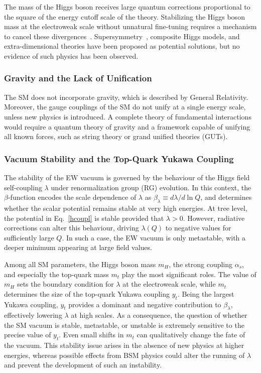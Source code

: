 The mass of the Higgs boson receives large quantum corrections proportional to the square of the energy cutoff scale of the theory. Stabilizing the Higgs boson mass at the electroweak scale without unnatural fine-tuning requires a mechanism to cancel these divergences~\cite{Weinberg:1975gm,Gildener:1976ai,Weinberg:1979bn,Susskind:1978ms}. Supersymmetry~\cite{Dimopoulos:1981zb,Witten:1981nf,Dine:1981za,Dimopoulos:1981au,Sakai:1981gr,Kaul:1981hi}, composite Higgs models, and extra-dimensional theories have been proposed as potential solutions, but no evidence of such physics has been observed.

\subsubsection*{Gravity and the Lack of Unification}

The SM does not incorporate gravity, which is described by General Relativity. Moreover, the gauge couplings of the SM do not unify at a single energy scale, unless new physics is introduced. A complete theory of fundamental interactions would require a quantum theory of gravity and a framework capable of unifying all known forces, such as string theory or grand unified theories (GUTs).

\subsubsection*{Vacuum Stability and the Top-Quark Yukawa Coupling}

The stability of the EW vacuum is governed by the behaviour of the Higgs field self-coupling $\lambda$ under renormalization group (RG) evolution. In this context, the $\beta$-function encodes the scale dependence of $\lambda$ as
$\beta_\lambda \equiv d\lambda/ d \ln Q$, and determines whether the scalar potential remains stable at very high energies. At tree level, the potential in Eq.~\ref{hcoupl} is stable provided that $\lambda>0$. However, radiative corrections can alter this behaviour, driving $\lambda(Q)$ to negative values for sufficiently large $Q$. In such a case, the EW vacuum is only metastable, with a deeper minimum appearing at large field values.

Among all SM parameters, the Higgs boson mass $m_H$, the strong coupling $\alpha_s$, and especially the top-quark mass $m_t$ play the most significant roles. The value of $m_H$ sets the boundary condition for $\lambda$ at the electroweak scale, while $m_t$ determines the size of the top-quark Yukawa coupling $y_t$. Being the largest Yukawa coupling, $y_t$ provides a dominant and negative contribution to $\beta_\lambda$, effectively lowering $\lambda$ at high scales. As a consequence, the question of whether the SM vacuum is stable, metastable, or unstable is extremely sensitive to the precise value of $y_t$. Even small shifts in $m_t$ can qualitatively change the fate of the vacuum. This stability issue arises in the absence of new physics at higher energies, whereas possible effects from BSM physics could alter the running of $\lambda$ and prevent the development of such an instability.

